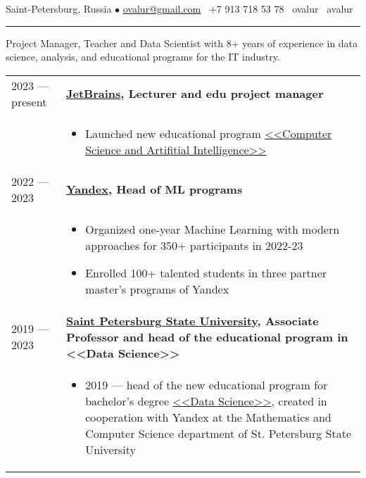 \documentclass[11pt]{article}
\begin{document}
%

\vspace{0.5em}

\noindent Saint-Petersburg, Russia $\bullet$ \href{mailto:ovalur@gmail.com}{ovalur@gmail.com} \faMobile~+7 913 718 53 78 \faSendO~ovalur
\faGithub~avalur

\vspace{0.5em}
\hrule
\vspace{0.5em}

Project Manager, Teacher and Data Scientist with 8+ years of experience in data science, analysis, and educational programs for the IT industry.

\vspace{0.5em}
\begin{longtable} {l | p{}}
2023 — present & {\textbf{\href{https://jetbrains.com}{JetBrains}, Lecturer and edu project manager}} \\
& \vspace{-1.5em} 
	\begin{itemize}
		\item Launched new educational program \href{https://blog.jetbrains.com/education/2023/05/03/introducing-the-computer-science-and-artificial-intelligence-bachelor-s-program-with-neapolis-university-paphos/}{<<Computer Science and Artifitial Intelligence>>}
	\end{itemize} \\
2022 — 2023 & {\textbf{\href{https://ya.ru/}{Yandex}, Head of ML programs}} \\
& \vspace{-1.5em}
	\begin{itemize}
		\item Organized one-year Machine Learning with modern approaches for 350+ participants in 2022-23
		\item Enrolled 100+ talented students in three partner master's programs of Yandex
	\end{itemize} \\
2019 — 2023 & {\textbf{\href{https://english.spbu.ru/}{Saint Petersburg State University}, Associate Professor and head of the educational program in <<Data Science>>}} \\
& \vspace{-1.5em}
\begin{itemize}
\item 2019 — head of the new educational program for bachelor's degree \href{https://maad.compscicenter.ru}{<<Data Science>>}, created in cooperation with Yandex at the Mathematics and Computer Science department of St. Petersburg State University


\end{itemize}
\end{longtable}
\end{document}
